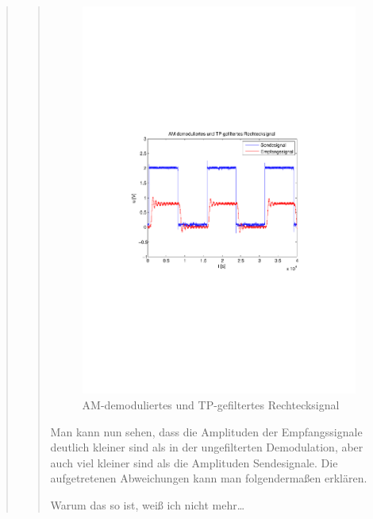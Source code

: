 \begin{quote}
\begin{quote}
             \begin{figure}[H] \centering
                    \includegraphics[scale=0.5, trim = 2cm 6.5cm 1.5cm 8.5cm,
                    clip]{./Bilder/synchDemodFilter_rechteck}
                        \caption{AM-demoduliertes und
                        TP-gefiltertes Rechtecksignal}
                \end{figure}
                
                Man kann nun sehen, dass die Amplituden der Empfangssignale
                deutlich kleiner sind als in der ungefilterten Demodulation,
                aber auch viel kleiner sind als die Amplituden Sendesignale.
                Die aufgetretenen Abweichungen kann man folgendermaßen erklären.
                
                Warum das so ist, weiß ich nicht mehr\ldots
                
                 
         
    \end{quote}
\end{quote}

